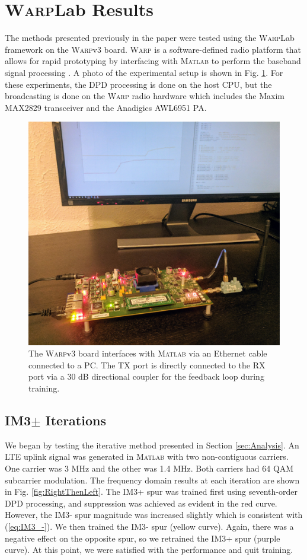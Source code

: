 \section{\textsc{Warp}Lab Results}
\label{sec:WARPLabResults}
The methods presented previously in the paper were tested using the \textsc{Warp}Lab framework on the \textsc{Warp}v3 board. 
\textsc{Warp} is a software-defined radio platform that allows for rapid prototyping by interfacing with \textsc{Matlab} to perform the baseband signal processing  \cite{warpProject}. 
A photo of the experimental setup is shown in Fig. \ref{fig:exp_setup}. 
For these experiments, the DPD processing is done on the host CPU, but the broadcasting is done on the \textsc{Warp} radio hardware which includes the Maxim MAX2829 transceiver and the Anadigics AWL6951 PA.

\begin{figure}[]
\centering
\includegraphics[width=0.75\columnwidth]{Figures/Setup.jpg}
\caption{The \textsc{Warp}v3 board interfaces with \textsc{Matlab} via an Ethernet cable connected to a PC. The TX port is directly connected to the RX port via a 30 dB directional coupler for the feedback loop during training.}
\label{fig:exp_setup}
\end{figure}

\subsection{IM3$\pm$ Iterations}
We began by testing the iterative method presented in Section \ref{sec:Analysis}. 
An LTE uplink signal was generated in \textsc{Matlab} with two non-contiguous carriers. 
One carrier was 3 MHz and the other was 1.4 MHz. 
Both carriers had 64 QAM subcarrier modulation. 
The frequency domain results at each iteration are shown in Fig. \ref{fig:RightThenLeft}. 
The IM3+ spur was trained first using seventh-order DPD processing, and suppression was achieved as evident in the red curve. 
However, the IM3- spur magnitude was increased slightly which is consistent with (\ref{eq:IM3_-}). 
We then trained the IM3- spur (yellow curve). 
Again, there was a negative effect on the opposite spur, so we retrained the IM3+ spur (purple curve). 
At this point, we were satisfied with the performance and quit training. 

